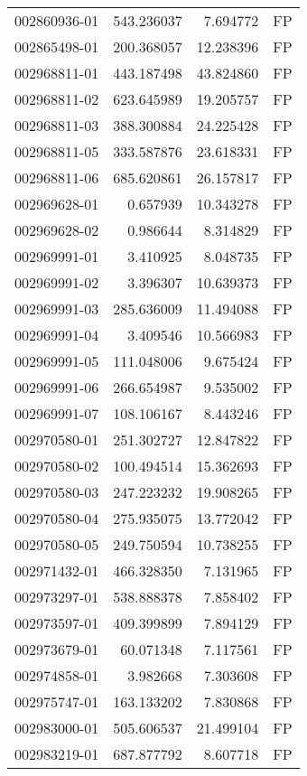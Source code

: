 \begin{tabular}{lrrl}
002860936-01 &  543.236037 &     7.694772 &   FP \\
002865498-01 &  200.368057 &    12.238396 &   FP \\
002968811-01 &  443.187498 &    43.824860 &   FP \\
002968811-02 &  623.645989 &    19.205757 &   FP \\
002968811-03 &  388.300884 &    24.225428 &   FP \\
002968811-05 &  333.587876 &    23.618331 &   FP \\
002968811-06 &  685.620861 &    26.157817 &   FP \\
002969628-01 &    0.657939 &    10.343278 &   FP \\
002969628-02 &    0.986644 &     8.314829 &   FP \\
002969991-01 &    3.410925 &     8.048735 &   FP \\
002969991-02 &    3.396307 &    10.639373 &   FP \\
002969991-03 &  285.636009 &    11.494088 &   FP \\
002969991-04 &    3.409546 &    10.566983 &   FP \\
002969991-05 &  111.048006 &     9.675424 &   FP \\
002969991-06 &  266.654987 &     9.535002 &   FP \\
002969991-07 &  108.106167 &     8.443246 &   FP \\
002970580-01 &  251.302727 &    12.847822 &   FP \\
002970580-02 &  100.494514 &    15.362693 &   FP \\
002970580-03 &  247.223232 &    19.908265 &   FP \\
002970580-04 &  275.935075 &    13.772042 &   FP \\
002970580-05 &  249.750594 &    10.738255 &   FP \\
002971432-01 &  466.328350 &     7.131965 &   FP \\
002973297-01 &  538.888378 &     7.858402 &   FP \\
002973597-01 &  409.399899 &     7.894129 &   FP \\
002973679-01 &   60.071348 &     7.117561 &   FP \\
002974858-01 &    3.982668 &     7.303608 &   FP \\
002975747-01 &  163.133202 &     7.830868 &   FP \\
002983000-01 &  505.606537 &    21.499104 &   FP \\
002983219-01 &  687.877792 &     8.607718 &   FP \\

\end{tabular}
